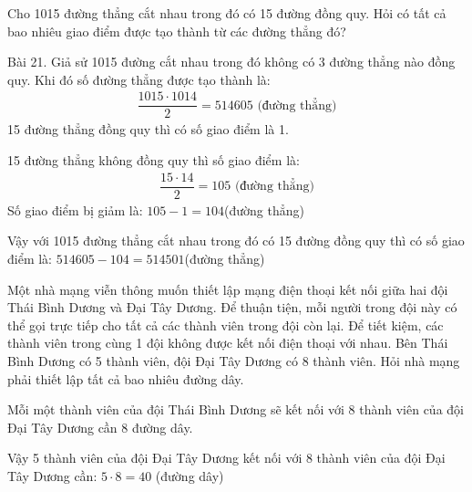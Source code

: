\begin{bt}
	Cho 1015 đường thẳng cắt nhau trong đó có 15 đường đồng quy. Hỏi có tất cả bao nhiêu giao điểm được tạo thành từ các đường thẳng đó?
	\begin{loigiaichuong28}
		Bài 21. Giả sử 1015 đường cắt nhau trong đó không có 3 đường thẳng nào đồng quy. Khi đó số đường thẳng được tạo thành là:
		\begin{align*}
			\dfrac{1015\cdot1014}{2}=514605 \text{ (đường thẳng)}
		\end{align*}
		15 đường thẳng đồng quy thì có số giao điểm là 1.
		
		15 đường thẳng không đồng quy thì số giao điểm là: 
		\begin{align*}
			\dfrac{15\cdot14}{2}=105 \text{ (đường thẳng)}
		\end{align*}
		Số giao điểm bị giảm là: $105-1=104$(đường thẳng)
		
		Vậy với 1015 đường thẳng cắt nhau trong đó có 15 đường đồng quy thì có số giao điểm là: $514605-104=514501$(đường thẳng)
	\end{loigiaichuong28}
\end{bt}
\begin{bt}
	Một nhà mạng viễn thông muốn thiết lập mạng điện thoại kết nối giữa hai đội Thái Bình Dương và Đại Tây Dương. Để thuận tiện, mỗi người trong đội này có thể gọi trực tiếp cho tất cả các thành viên trong đội còn lại. Để tiết kiệm, các thành viên trong cùng 1 đội không được kết nối điện thoại với nhau. Bên Thái Bình Dương có 5 thành viên, đội Đại Tây Dương có 8 thành viên. Hỏi nhà mạng phải thiết lập tất cả bao nhiêu đường dây.
	\begin{center}
	\end{center}
	\begin{loigiaichuong28}
		Mỗi một thành viên của đội Thái Bình Dương sẽ kết nối với 8 thành viên của đội Đại Tây Dương cần 8 đường dây.
		
		Vậy 5 thành viên của đội Đại Tây Dương kết nối với 8 thành viên của đội Đại Tây Dương cần: $5\cdot8=40$ (đường dây)
	\end{loigiaichuong28}
\end{bt}

